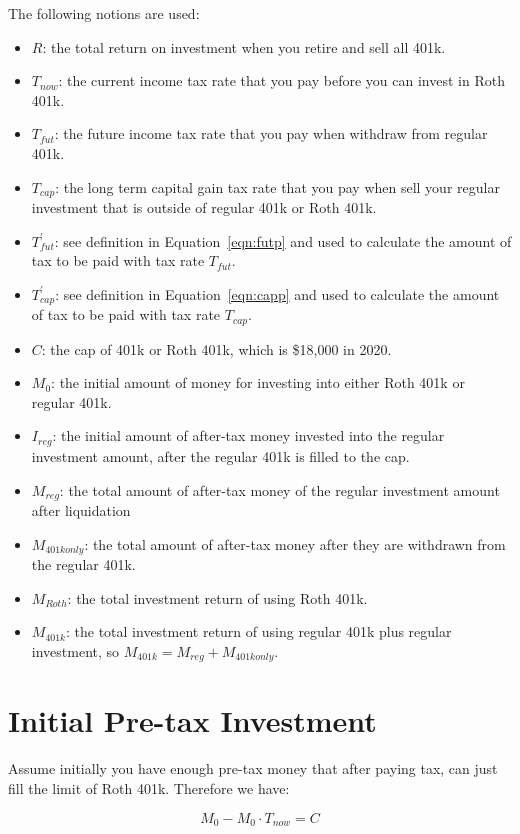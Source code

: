 \documentclass[twocolumn]{article}
\begin{document}
The following notions are used:
\begin{itemize}
  \item $R$: the total return on investment when you retire and sell all 401k.
  \item $T_{now}$: the current income tax rate that you pay before you can
    invest in Roth 401k.
  \item $T_{fut}$: the future income tax rate that you pay when withdraw from
    regular 401k.
  \item $T_{cap}$: the long term capital gain tax rate that you pay when sell
    your regular investment that is outside of regular 401k or Roth 401k.
    \item $T_{fut}^{\prime}$: see definition in Equation~\ref{eqn:futp} and used to
    calculate the amount of tax to be paid with tax rate $T_{fut}$.
    \item $T_{cap}^{\prime}$: see definition in Equation~\ref{eqn:capp} and used to
    calculate the amount of tax to be paid with tax rate $T_{cap}$.
  \item $C$: the cap of 401k or Roth 401k, which is \$18,000 in 2020.
  \item $M_{0}$: the initial amount of money for investing into either Roth 401k or
  regular 401k.
  \item $I_{reg}$: the initial amount of after-tax money invested into the
  regular investment amount, after the regular 401k is filled to the cap.
  \item $M_{reg}$: the total amount of after-tax money of the
  regular investment amount after liquidation
  \item $M_{401konly}$: the total amount of after-tax money after they are
  withdrawn from the regular 401k.
  \item $M_{Roth}$: the total investment return of using Roth 401k.
  \item $M_{401k}$: the total investment return of using regular 401k plus
    regular investment, so $M_{401k} = M_{reg} + M_{401konly}$.
\end{itemize}

\section{Initial Pre-tax Investment}

Assume initially you have enough pre-tax money that after paying tax, can just fill the
limit of Roth 401k. Therefore we have:

\begin{equation}
  M_{0} - M_{0} \cdot T_{now} = C \label{eqn:m0}
\end{equation}
\end{document}
